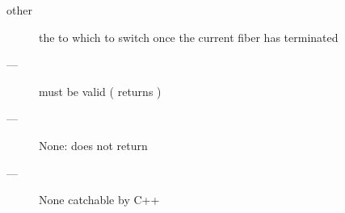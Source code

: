 \params
\begin{description}
    \item[other] the \fiber to which to switch once the current fiber has terminated
\end{description}

\requires
\begin{description}
    \item[---]  must be valid ( returns )
\end{description}

\returns
\begin{description}
    \item[---] None: \unwindfib does not return
\end{description}

\except
\begin{description}
    \item[---] None catchable by C++
\end{description}
